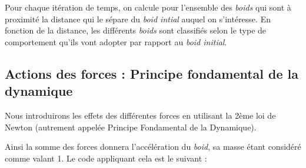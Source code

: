 \documentclass[
]{article}
\begin{document}
Pour chaque itération de temps, on calcule pour l'ensemble des
\emph{boids} qui sont à proximité la distance qui le sépare du
\emph{boid intial} auquel on s'intéresse. En fonction de la distance,
les différents \emph{boids} sont classifiés selon le type de
comportement qu'ils vont adopter par rapport au \emph{boid initial}.

\hypertarget{actions-des-forces-principe-fondamental-de-la-dynamique}{%
\subsection{Actions des forces : Principe fondamental de la
dynamique}\label{actions-des-forces-principe-fondamental-de-la-dynamique}}

Nous introduirons les effets des différentes forces en utilisant la 2ème
loi de Newton (autrement appelée Principe Fondamental de la Dynamique).

Ainsi la somme des forces donnera l'accélération du \emph{boid}, sa
masse étant considéré comme valant 1. Le code appliquant cela est le
suivant :
\end{document}

